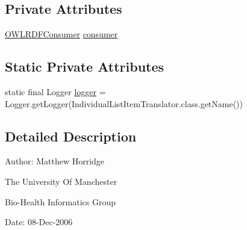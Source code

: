 \subsection*{Private Attributes}
\begin{DoxyCompactItemize}
\item 
\hyperlink{classorg_1_1coode_1_1owlapi_1_1rdfxml_1_1parser_1_1_o_w_l_r_d_f_consumer}{O\-W\-L\-R\-D\-F\-Consumer} \hyperlink{classorg_1_1coode_1_1owlapi_1_1rdfxml_1_1parser_1_1_individual_list_item_translator_acf6dac9a268d5106743e43ea36cbccaf}{consumer}
\end{DoxyCompactItemize}
\subsection*{Static Private Attributes}
\begin{DoxyCompactItemize}
\item 
static final Logger \hyperlink{classorg_1_1coode_1_1owlapi_1_1rdfxml_1_1parser_1_1_individual_list_item_translator_ab1a2a3a172b4855b1bde3b6f92164aaf}{logger} = Logger.\-get\-Logger(Individual\-List\-Item\-Translator.\-class.\-get\-Name())
\end{DoxyCompactItemize}


\subsection{Detailed Description}
Author\-: Matthew Horridge\par
 The University Of Manchester\par
 Bio-\/\-Health Informatics Group\par
 Date\-: 08-\/\-Dec-\/2006\par
\par
 

